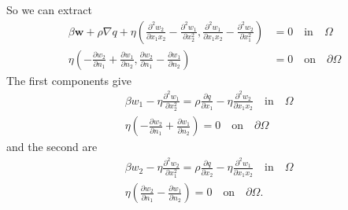 \documentclass[11pt, a4paper]{article}
\theoremstyle{definition}
\newcommand{\w}{\mathbf{w}}
\begin{document}
So we can extract
\begin{align*}
	\beta \w + \rho \nabla q + \eta \left(\frac{\partial^2 w_2}{\partial x_1 x_2} -\frac{\partial^2 w_1}{\partial x_2^2} , \frac{\partial^2 w_1}{\partial x_1x_2} -\frac{\partial^2 w_2}{\partial x_1^2}  \right) &= 0 \quad \text{in} \quad \Omega\\
	\eta \left(-\frac{\partial w_2}{\partial n_1} +\frac{\partial w_1}{\partial n_2}, \frac{\partial w_2}{\partial n_1} -\frac{\partial w_1}{\partial n_2} \right) &= 0 \quad \text{on} \quad \partial \Omega
\end{align*}
The first components give
\begin{align*}
	&\beta w_1 - \eta \frac{\partial^2 w_1}{\partial x_2^2} = \rho \frac{\partial q}{\partial x_1} - \eta\frac{\partial^2 w_2}{\partial x_1 x_2} \quad \text{in} \quad \Omega\\
	&\eta\left( -\frac{\partial w_2}{\partial n_1} +\frac{\partial w_1}{\partial n_2} \right) = 0 \quad \text{on} \quad \partial \Omega
\end{align*}
and the second are
\begin{align*}
	&\beta w_2 - \eta \frac{\partial^2 w_2}{\partial x_1^2} = \rho \frac{\partial q}{\partial x_2} - \eta \frac{\partial^2 w_1}{\partial x_1x_2}\quad \text{in} \quad \Omega\\
	&\eta \left(\frac{\partial w_2}{\partial n_1} -\frac{\partial w_1}{\partial n_2} \right) = 0 \quad \text{on} \quad \partial \Omega.
\end{align*}
\end{document}
